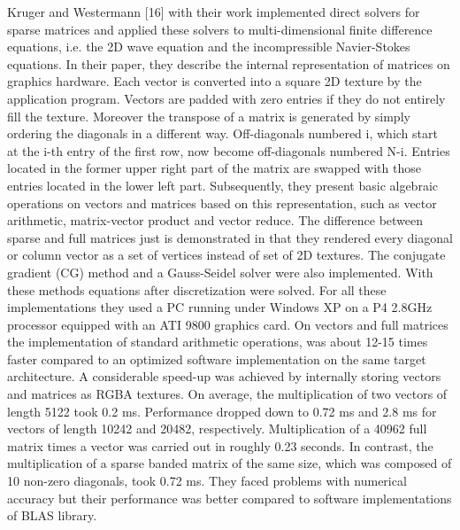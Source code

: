 Kruger and Westermann [16] with their work implemented direct solvers for sparse matrices and applied these solvers to multi-dimensional finite difference equations, i.e. the 2D wave equation and the incompressible Navier-Stokes equations. In their paper, they describe the internal representation of matrices on graphics hardware. Each vector is converted into a square 2D texture by the application program. Vectors are padded with zero entries if they do not entirely fill the texture. Moreover the transpose of a matrix is generated by simply ordering the diagonals in a different way. Off-diagonals numbered i, which start at the i-th entry of the first row, now become off-diagonals numbered N-i. Entries located in the former upper right part of the matrix are swapped with those entries located in the lower left part. Subsequently, they present basic algebraic operations on vectors and matrices based on this representation, such as vector arithmetic, matrix-vector product and vector reduce. The difference between sparse and full matrices just is demonstrated in that they rendered every diagonal or column vector as a set of vertices instead of set of 2D textures. The conjugate gradient (CG) method and a Gauss-Seidel solver were also implemented. With these methods equations after discretization were solved. For all these implementations they used a PC running under Windows XP on a P4 2.8GHz processor equipped with an ATI 9800 graphics card.  On vectors and full matrices the implementation of standard arithmetic operations, was about 12-15 times faster compared to an optimized software implementation on the same target architecture. A considerable speed-up was achieved by internally storing vectors and matrices as RGBA textures. On average, the multiplication of two vectors of length 5122 took 0.2 ms. Performance dropped down to 0.72 ms and 2.8 ms for vectors of length 10242 and 20482, respectively. Multiplication of a 40962 full matrix times a vector was carried out in roughly 0.23 seconds. In contrast, the multiplication of a sparse banded matrix of the same size, which was composed of 10 non-zero diagonals, took 0.72 ms. They faced problems with numerical accuracy but their performance was better compared to software implementations of BLAS library.


